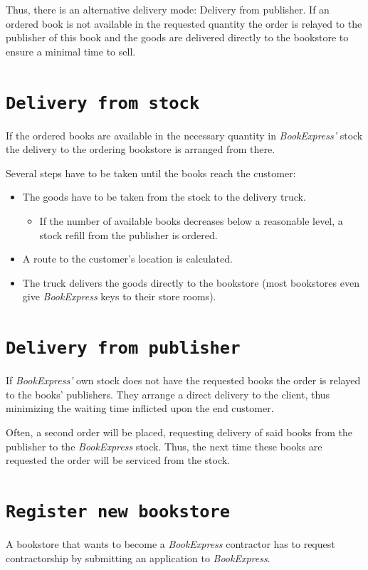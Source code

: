 Thus, there is an alternative delivery mode: Delivery from publisher. If an ordered book is not available in the requested quantity
the order is relayed to the publisher of this book and the goods are delivered directly to the bookstore to ensure a minimal time to sell.

\section{\texttt{Delivery from stock}}
If the ordered books are available in the necessary quantity in \emph{BookExpress'} stock the delivery to the ordering bookstore is
arranged from there.

Several steps have to be taken until the books reach the customer:
\begin{itemize}
	\item The goods have to be taken from the stock to the delivery truck.
		\begin{itemize}
			\item If the number of available books decreases below a reasonable level, a stock refill from the publisher is ordered.
		\end{itemize}
	\item A route to the customer's location is calculated.
	\item The truck delivers the goods directly to the bookstore (most bookstores even give \emph{BookExpress} keys to their store rooms).
\end{itemize}


\section{\texttt{Delivery from publisher}}
If \emph{BookExpress'} own stock does not have the requested books the order is relayed to the books' publishers. They arrange a direct delivery
to the client, thus minimizing the waiting time inflicted upon the end customer.

Often, a second order will be placed, requesting delivery of said books from the publisher to the \emph{BookExpress} stock. Thus, the next time these
books are requested the order will be serviced from the stock.


\section{\texttt{Register new bookstore}}
A bookstore that wants to become a \emph{BookExpress} contractor has to request contractorship by submitting an application to \emph{BookExpress}.

